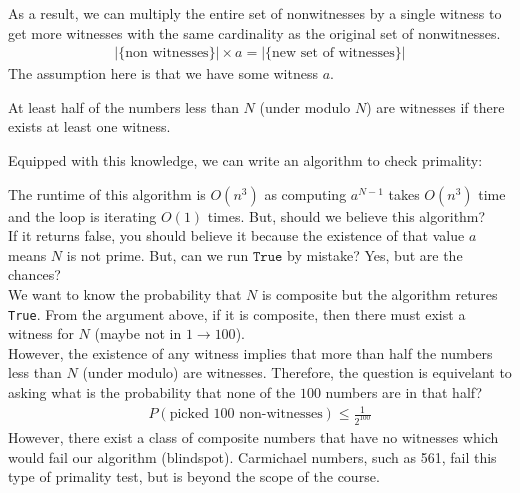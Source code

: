 \documentclass[14pt]{extarticle}
\begin{document}
    As a result, we can multiply the entire set of nonwitnesses by a single
    witness to get more witnesses with the same cardinality as the original
    set of nonwitnesses.
    \begin{align*}
        |\{\text{non witnesses}\}| \times a = |\{\text{new set of witnesses}\}|
    \end{align*}
    The assumption here is that we have some witness $a$.

    \begin{theorem*}
        At least half of the numbers less than $N$ (under modulo $N$) are
        witnesses if there exists at least one witness.
    \end{theorem*}

    Equipped with this knowledge, we can write an algorithm to check primality:

    \begin{algorithm}[H]
    \end{algorithm}

    The runtime of this algorithm is $O(n^3)$ as computing $a^{N-1}$ takes
    $O(n^3)$ time and the loop is iterating $O(1)$ times. But, should we
    believe this algorithm?\\

    If it returns false, you should believe it because the existence of that
    value $a$ means $N$ is not prime. But, can we run $\texttt{True}$ by
    mistake? Yes, but are the chances?\\

    We want to know the probability that $N$ is composite but the algorithm
    retures \texttt{True}. From the argument above, if it is composite, then
    there must exist a witness for $N$ (maybe not in $1\to 100$).\\

    However, the existence of any witness implies that more than half
    the numbers less than $N$ (under modulo) are witnesses. Therefore, the
    question is equivelant to asking what is the probability that none
    of the $100$ numbers are in that half?
    \begin{align*}
        P(\text{picked 100 non-witnesses}) \leq \frac{1}{2^{100}}
    \end{align*}
    However, there exist a class of composite numbers that have no witnesses
    which would fail our algorithm (blindspot). Carmichael numbers, such as
    561, fail this type of primality test, but is beyond the scope of
    the course.
\end{document}
